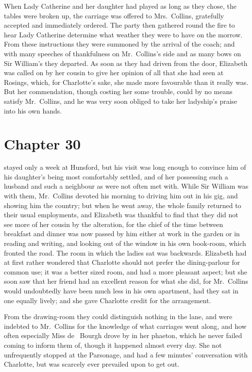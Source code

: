 When Lady Catherine and her daughter had played as long as
they chose, the tables were broken up, the carriage was offered
to Mrs.\ Collins, gratefully accepted and immediately ordered.
The party then gathered round the fire to hear Lady Catherine
determine what weather they were to have on the morrow.  From
these instructions they were summoned by the arrival of the
coach; and with many speeches of thankfulness on Mr.\ Collins's
side and as many bows on Sir William's they departed.  As soon
as they had driven from the door, Elizabeth was called on by her
cousin to give her opinion of all that she had seen at Rosings,
which, for Charlotte's sake, she made more favourable than it
really was.  But her commendation, though costing her some
trouble, could by no means satisfy Mr.\ Collins, and he was very
soon obliged to take her ladyship's praise into his own hands.



\chapter{Chapter 30}


 stayed only a week at Hunsford, but his visit was
long enough to convince him of his daughter's being most
comfortably settled, and of her possessing such a husband and
such a neighbour as were not often met with.  While Sir William
was with them, Mr.\ Collins devoted his morning to driving him
out in his gig, and showing him the country; but when he went
away, the whole family returned to their usual employments, and
Elizabeth was thankful to find that they did not see more of
her cousin by the alteration, for the chief of the time between
breakfast and dinner was now passed by him either at work in
the garden or in reading and writing, and looking out of the
window in his own book-room, which fronted the road.  The
room in which the ladies sat was backwards.  Elizabeth had at
first rather wondered that Charlotte should not prefer the
dining-parlour for common use; it was a better sized room, and
had a more pleasant aspect; but she soon saw that her friend
had an excellent reason for what she did, for Mr.\ Collins would
undoubtedly have been much less in his own apartment, had they
sat in one equally lively; and she gave Charlotte credit for
the arrangement.

From the drawing-room they could distinguish nothing in the
lane, and were indebted to Mr.\ Collins for the knowledge of
what carriages went along, and how often especially Miss de~%
Bourgh drove by in her phaeton, which he never failed coming
to inform them of, though it happened almost every day.  She
not unfrequently stopped at the Parsonage, and had a few
minutes' conversation with Charlotte, but was scarcely ever
prevailed upon to get out.

